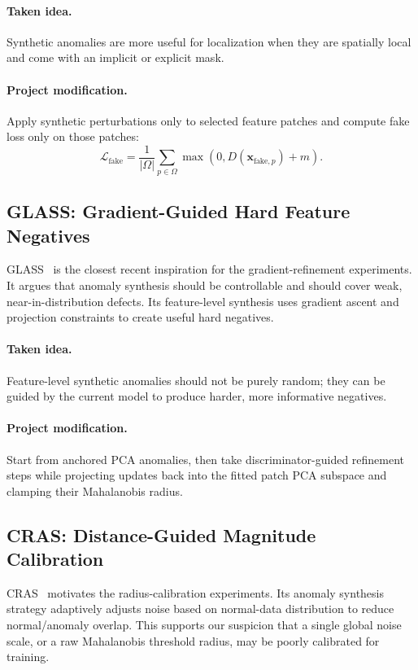 \documentclass[11pt]{article}
\begin{document}
\paragraph{Taken idea.}
Synthetic anomalies are more useful for localization when they are spatially
local and come with an implicit or explicit mask.

\paragraph{Project modification.}
Apply synthetic perturbations only to selected feature patches and compute fake
loss only on those patches:
\[
  \mathcal{L}_{\mathrm{fake}}
  =
  \frac{1}{|\Omega|}
  \sum_{p \in \Omega}
  \max(0, D(\mathbf{x}_{\mathrm{fake},p}) + m).
\]

\subsection{GLASS: Gradient-Guided Hard Feature Negatives}

GLASS~\cite{glass} is the closest recent inspiration for the gradient-refinement
experiments. It argues that anomaly synthesis should be controllable and should
cover weak, near-in-distribution defects. Its feature-level synthesis uses
gradient ascent and projection constraints to create useful hard negatives.

\paragraph{Taken idea.}
Feature-level synthetic anomalies should not be purely random; they can be
guided by the current model to produce harder, more informative negatives.

\paragraph{Project modification.}
Start from anchored PCA anomalies, then take discriminator-guided refinement
steps while projecting updates back into the fitted patch PCA subspace and
clamping their Mahalanobis radius.

\subsection{CRAS: Distance-Guided Magnitude Calibration}

CRAS~\cite{cras} motivates the radius-calibration experiments. Its anomaly
synthesis strategy adaptively adjusts noise based on normal-data distribution to
reduce normal/anomaly overlap. This supports our suspicion that a single global
noise scale, or a raw Mahalanobis threshold radius, may be poorly calibrated for
training.
\end{document}
